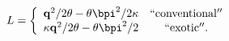\begin{equation}
L=\left\{\begin{array}{cc}
{{\bf q}^2}/{2\theta}-{\theta {\bpi^2}}/{2\kappa}& {\rm ``conventional''}\\
\kappa{{\bf q}^2}/{2\theta}-{\theta {\bpi^2}}/{2}&{\rm ``exotic''}.
\end{array}\right.
\label{ang}\end{equation}

